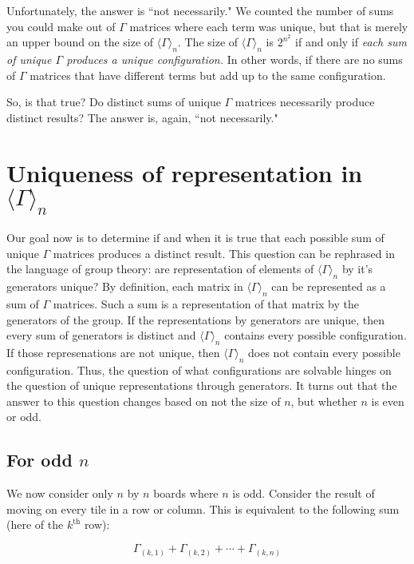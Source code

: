 \documentclass{article}[12pt]
\newcommand{\supt}[1]{^{\text{#1}}}
\newcommand{\gen}[2]{\Gamma_{(#1,#2)}}
\newcommand{\subgroup}[1]{\langle\Gamma\rangle_{#1}}
\begin{document}
Unfortunately, the answer is ``not necessarily."  We counted the number of sums you could make out of $\Gamma$ matrices where each term was unique, but that is merely an upper bound on the size of $\subgroup{n}$.  The size of $\subgroup{n}$ is $2^{n^2}$ if and only if \emph{each sum of unique $\Gamma$ produces a unique configuration.}  In other words, if there are no sums of $\Gamma$ matrices that have different terms but add up to the same configuration.

So, is that true?  Do distinct sums of unique $\Gamma$ matrices necessarily produce distinct results?  The answer is, again, ``not necessarily."

\section{Uniqueness of representation in $\subgroup{n}$}

Our goal now is to determine if and when it is true that each possible sum of unique $\Gamma$ matrices produces a distinct result.  This question can be rephrased in the language of group theory: are representation of elements of $\subgroup{n}$ by it's generators unique?  By definition, each matrix in $\subgroup{n}$ can be represented as a sum of $\Gamma$ matrices.  Such a sum is a representation of that matrix by the generators of the group.  If the representations by generators are unique, then every sum of generators is distinct and $\subgroup{n}$ contains every possible configuration.  If those represenations are not unique, then $\subgroup{n}$ does not contain every possible configuration.  Thus, the question of what configurations are solvable hinges on the question of unique representations through generators.  It turns out that the answer to this question changes based on not the size of $n$, but whether $n$ is even or odd.

\subsection{For odd $n$}

We now consider only $n$ by $n$ boards where $n$ is odd.  Consider the result of moving on every tile in a row or column.  This is equivalent to the following sum (here of the $k\supt{th}$ row):

\begin{equation}
\label{sum_row}
\gen{k}{1} + \gen{k}{2} + \cdots + \gen{k}{n}
\end{equation}
\end{document}
